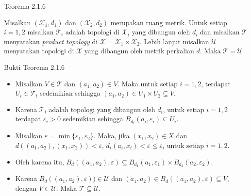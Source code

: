     \begin{frame}{Teorema 2.1.6}
    \begin{tcolorbox}[title=Teorema 2.1.6]
        Misalkan $(\mathcal{X}_{1},d_1)$ dan $(\mathcal{X}_{2},d_2)$ merupakan ruang metrik. Untuk setiap $i = 1,2$ misalkan $\mathcal{T}_{i}$ adalah topologi di $\mathcal{X}_{i}$ yang dibangun oleh $d_i$ dan misalkan $\mathcal{T}$ menyatakan \textit{product topology} di $\mathcal{X} = \mathcal{X}_{1} \times \mathcal{X}_{2}$. Lebih lanjut misalkan $\mathcal{U}$ menyatakan topologi di $\mathcal{X}$ yang dibangun oleh metrik perkalian $d$. Maka $\mathcal{T} = \mathcal{U}$
    \end{tcolorbox}
    \end{frame}
    
    \begin{frame}{Bukti Teorema 2.1.6}
    \begin{tcolorbox}[title=Bukti Teorema 2.1.6]
    \begin{itemize}
        \item Misalkan \( V \in \mathcal{T} \) dan \( (a_1, a_2) \in V \). Maka untuk setiap \( i = 1, 2 \), terdapat \( U_i \in \mathcal{T}_i \) sedemikian sehingga \( (a_1, a_2) \in U_1 \times U_2 \subseteq V \).
        \item Karena \(\mathcal{T}_i\) adalah topologi yang dibangun oleh \( d_i \), untuk setiap \( i = 1, 2 \) terdapat \( \varepsilon_i > 0 \) sedemikian sehingga \( B_{d_i}(a_i, \varepsilon_i) \subseteq U_i \).
        \item Misalkan \( \varepsilon = \min\{\varepsilon_1, \varepsilon_2\} \). Maka, jika \( (x_1, x_2) \in X \) dan \( d((a_1, a_2), (x_1, x_2)) < \varepsilon \), \( d_i(a_i, x_i) < \varepsilon \leq \varepsilon_i \) untuk setiap \( i = 1, 2 \).
        \item Oleh karena itu, $B_d((a_1, a_2), \varepsilon) \subseteq B_{d_1}(a_1, \varepsilon_1) \times B_{d_2}(a_2, \varepsilon_2).$
        \item Karena \( B_{d}((a_1,a_2), \varepsilon)) \in \mathcal{U} \) dan \( (a_1, a_2) \in B_d((a_1, a_2), \varepsilon) \subseteq V \), dengan \( V \in \mathcal{U} \). Maka \( \mathcal{T} \subseteq \mathcal{U} \).
    \end{itemize}
    
    \end{tcolorbox}
    \end{frame}
    
